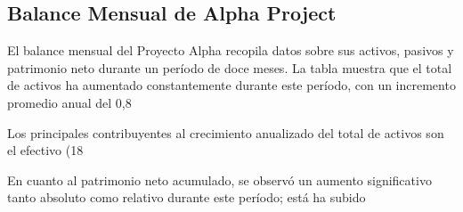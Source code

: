 

\subsection{Balance Mensual de Alpha Project}\label{sec:title}


El balance mensual del Proyecto Alpha recopila datos sobre sus activos, pasivos y patrimonio neto durante un período de doce meses. La tabla muestra que el total de activos ha aumentado constantemente durante este período, con un incremento promedio anual del 0,8%

Los principales contribuyentes al crecimiento anualizado del total de activos son el efectivo (18%

En cuanto al patrimonio neto acumulado, se observó un aumento significativo tanto absoluto como relativo durante este período; está ha subido